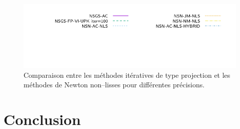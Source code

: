 \documentclass{CSMA2017}
\begin{document}
\begin{figure}[htbp]
   \includegraphics{figure/LowWall_FEM.1e-2.with_guess/simple/profile-LMGC_LowWall_FEM_legend.pdf}
  \caption{Comparaison entre les méthodes itératives de type projection et les méthodes de Newton non--lisses pour différentes précisions.}
  \label{fig:LowWall_FEM.simple}
\end{figure}







\section{Conclusion}
\end{document}
